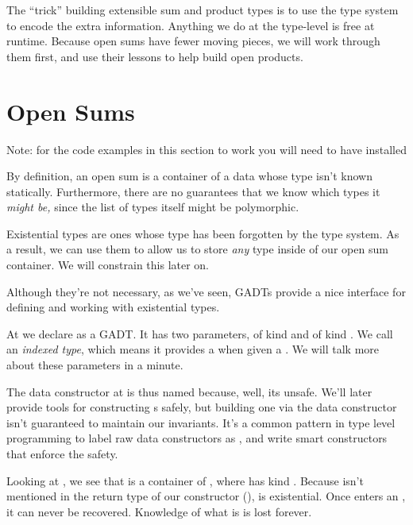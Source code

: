 \documentclass[book.tex]{subfiles}
\begin{document}
The ``trick'' building extensible sum and product types is to use the
type system to encode the extra information. Anything we do at the type-level is
free at runtime. Because open sums have fewer moving pieces, we will work
through them first, and use their lessons to help build open products.


\section{Open Sums}


Note: for the code examples in this section to work you will need to have \cite{fcf} installed

By definition, an open sum is a container of a data whose type isn't known
statically. Furthermore, there are no guarantees that we know which types it
\emph{might be,} since the list of types itself might be polymorphic.

Existential types are ones whose type has been forgotten by the type system. As a
result, we can use them to allow us to store \emph{any} type inside of our open
sum container. We will constrain this later on.

Although they're not necessary, as we've seen, GADTs provide a nice interface
for defining and working with existential types.


At  we declare  as a GADT. It has two parameters, 
of kind  and  of kind \kind{[k]}. We call  an
\emph{indexed type}, which means it provides a  when given a
. We will talk more about these parameters in a minute.

The data constructor  at  is thus named because, well,
its unsafe. We'll later provide tools for constructing s safely, but
building one via the data constructor isn't guaranteed to maintain our
invariants. It's a common pattern in type level programming to label raw data
constructors as , and write smart constructors that enforce the
safety.

Looking at , we see that  is a container of , where
 has kind . Because  isn't mentioned in the return type of
our constructor (),  is existential. Once  enters an
, it can never be recovered. Knowledge of what  is is lost
forever.
\end{document}
